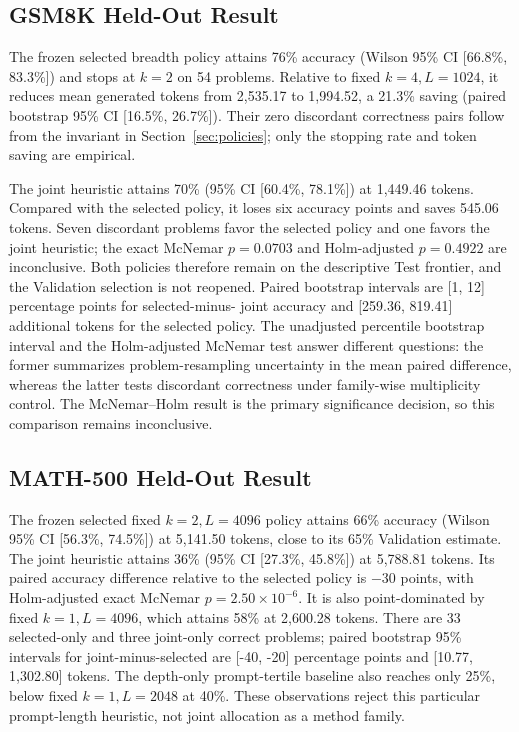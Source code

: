 \documentclass[runningheads]{llncs}
\begin{document}
\subsection{GSM8K Held-Out Result}

The frozen selected breadth policy attains 76\% accuracy (Wilson 95\% CI
[66.8\%, 83.3\%]) and stops at $k=2$ on 54 problems. Relative to fixed
$k=4,L=1024$, it reduces mean generated tokens from 2,535.17 to 1,994.52, a
21.3\% saving (paired bootstrap 95\% CI [16.5\%, 26.7\%]). Their zero
discordant correctness pairs follow from the invariant in
Section~\ref{sec:policies}; only the stopping rate and token saving are empirical.

The joint heuristic attains 70\% (95\% CI [60.4\%, 78.1\%]) at 1,449.46
tokens. Compared with the selected policy, it loses six accuracy points and
saves 545.06 tokens. Seven discordant problems favor the selected policy and
one favors the joint heuristic; the exact McNemar $p=0.0703$ and
Holm-adjusted $p=0.4922$ are inconclusive. Both policies therefore remain on
the descriptive Test frontier, and the Validation selection is not reopened.
Paired bootstrap intervals are [1, 12] percentage points for selected-minus-
joint accuracy and [259.36, 819.41] additional tokens for the selected policy.
The unadjusted percentile bootstrap interval and the Holm-adjusted McNemar test
answer different questions: the former summarizes problem-resampling
uncertainty in the mean paired difference, whereas the latter tests discordant
correctness under family-wise multiplicity control. The McNemar--Holm result is
the primary significance decision, so this comparison remains inconclusive.

\subsection{MATH-500 Held-Out Result}

The frozen selected fixed $k=2,L=4096$ policy attains 66\% accuracy (Wilson
95\% CI [56.3\%, 74.5\%]) at 5,141.50 tokens, close to its 65\% Validation
estimate. The joint heuristic attains 36\% (95\% CI [27.3\%, 45.8\%]) at
5,788.81 tokens. Its paired accuracy difference relative to the selected
policy is $-30$ points, with Holm-adjusted exact McNemar
$p=2.50\times10^{-6}$. It is also point-dominated by fixed $k=1,L=4096$,
which attains 58\% at 2,600.28 tokens.
There are 33 selected-only and three joint-only correct problems; paired
bootstrap 95\% intervals for joint-minus-selected are [-40, -20] percentage
points and [10.77, 1,302.80] tokens. The depth-only prompt-tertile baseline
also reaches only 25\%, below fixed $k=1,L=2048$ at 40\%. These observations
reject this particular prompt-length heuristic, not joint allocation as a
method family.
\end{document}

